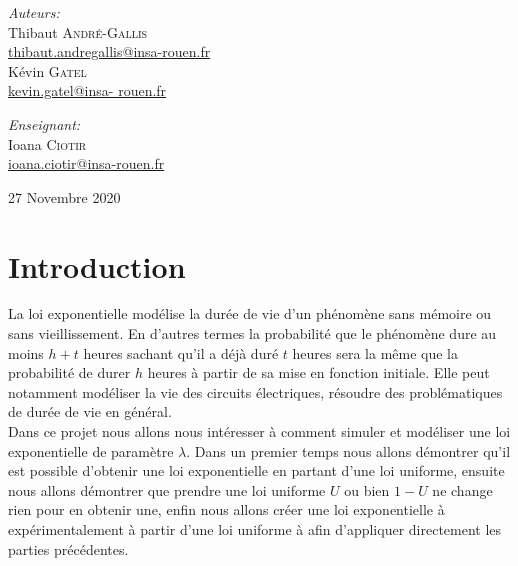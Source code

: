 \documentclass[12,french]{report}
\begin{document}
\begin{titlepage}
\begin{center}
	\begin{minipage}{0.4\textwidth}
		\begin{flushleft} \large
			\emph{Auteurs:}\\
			Thibaut \textsc{André-Gallis} \\
			{\small\href{mailto:thibaut.andregallis@insa-rouen.fr}{thibaut.andregallis@insa-rouen.fr}} \\
			Kévin \textsc{Gatel} \\
			{\small\href{mailto:kevin.gatel@insa-rouen.fr}{kevin.gatel@insa-				rouen.fr}}
		\end{flushleft}
	\end{minipage}
	\begin{minipage}{0.4\textwidth}
		\begin{flushright} \large
			\emph{Enseignant:} \\
			Ioana \textsc{Ciotir} \\
			{\small\href{mailto:ioana.ciotir@insa-rouen.fr}								{ioana.ciotir@insa-rouen.fr}}
		\end{flushright}
	\end{minipage}

	\vfill
	{\large 27 Novembre 2020}
\end{center}
\end{titlepage}

\tableofcontents


\renewcommand{\chaptername}{}
\chapter*{Introduction}

La loi exponentielle modélise la durée de vie d'un phénomène sans mémoire ou sans vieillissement. En d'autres termes la probabilité que le phénomène dure au moins $h+t$ heures sachant qu'il a déjà duré $t$ heures sera la même que la probabilité de durer $h$ heures à partir de sa mise en fonction initiale. Elle peut notamment modéliser la vie des circuits électriques, résoudre des problématiques de durée de vie en général.\\

Dans ce projet nous allons nous intéresser à comment simuler et modéliser une loi exponentielle de paramètre $\lambda$. Dans un premier temps nous allons démontrer qu'il est possible d'obtenir une loi exponentielle en partant d'une loi uniforme, ensuite nous allons démontrer que prendre une loi uniforme $U$ ou bien $1-U$ ne change rien pour en obtenir une, enfin nous allons créer une loi exponentielle à expérimentalement à partir d'une loi uniforme à afin d'appliquer directement les parties précédentes.
\end{document}
